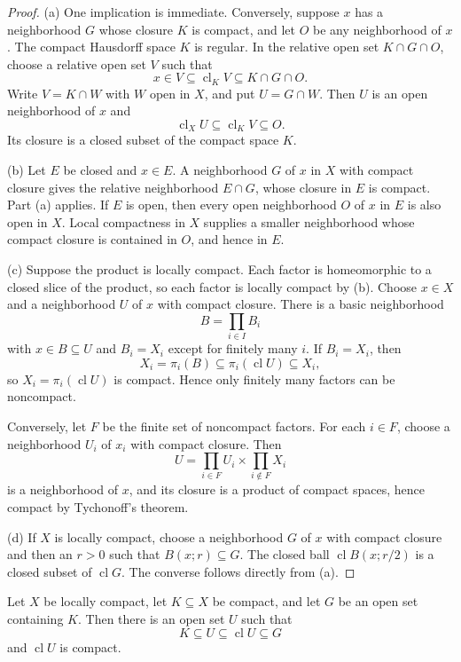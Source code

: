 \begin{proof}
(a) One implication is immediate. Conversely, suppose $x$ has a neighborhood
$G$ whose closure $K$ is compact, and let $O$ be any neighborhood of $x$.
The compact Hausdorff space $K$ is regular. In the relative open set
$K\cap G\cap O$, choose a relative open set $V$ such that
\[
x\in V\subseteq\operatorname{cl}_K V\subseteq K\cap G\cap O.
\]
Write $V=K\cap W$ with $W$ open in $X$, and put $U=G\cap W$. Then $U$ is an
open neighborhood of $x$ and
\[
\operatorname{cl}_XU\subseteq\operatorname{cl}_K V\subseteq O.
\]
Its closure is a closed subset of the compact space $K$.

(b) Let $E$ be closed and $x\in E$. A neighborhood $G$ of $x$ in $X$ with
compact closure gives the relative neighborhood $E\cap G$, whose closure in
$E$ is compact. Part (a) applies. If $E$ is open, then every open neighborhood $O$ of $x$
in $E$ is also open in $X$. Local compactness in $X$ supplies a smaller neighborhood whose
compact closure is contained in $O$, and hence in $E$.

(c) Suppose the product is locally compact. Each factor is homeomorphic to a
closed slice of the product, so each factor is locally compact by (b). Choose
$x\in X$ and a neighborhood $U$ of $x$ with compact closure. There is a basic
neighborhood
\[
B=\prod_{i\in I}B_i
\]
with $x\in B\subseteq U$ and $B_i=X_i$ except for finitely many $i$. If
$B_i=X_i$, then
\[
X_i=\pi_i(B)\subseteq\pi_i(\operatorname{cl}U)\subseteq X_i,
\]
so $X_i=\pi_i(\operatorname{cl}U)$ is compact. Hence only finitely many
factors can be noncompact.

Conversely, let $F$ be the finite set of noncompact factors. For each
$i\in F$, choose a neighborhood $U_i$ of $x_i$ with compact closure. Then
\[
U=\prod_{i\in F}U_i\times\prod_{i\notin F}X_i
\]
is a neighborhood of $x$, and its closure is a product of compact spaces,
hence compact by Tychonoff's theorem.

(d) If $X$ is locally compact, choose a neighborhood $G$ of $x$ with compact
closure and then an $r>0$ such that $B(x;r)\subseteq G$. The closed ball
$\operatorname{cl}B(x;r/2)$ is a closed subset of $\operatorname{cl}G$.
The converse follows directly from (a).
\end{proof}

\begin{lem}
Let $X$ be locally compact, let $K\subseteq X$ be compact, and let $G$ be an
open set containing $K$. Then there is an open set $U$ such that
\[
K\subseteq U\subseteq\operatorname{cl}U\subseteq G
\]
and $\operatorname{cl}U$ is compact.
\end{lem}

